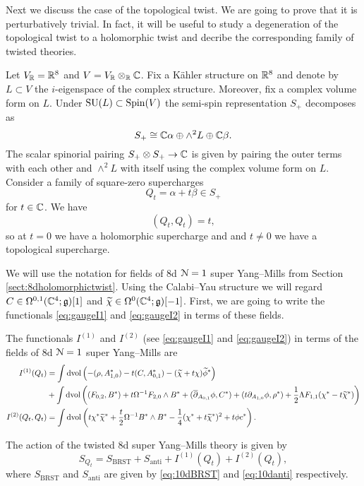 \documentclass[10pt, oneside]{article}
\begin{document}
Next we discuss the case of the topological twist. We are going to prove that it is perturbatively trivial. In fact, it will be useful to study a degeneration of the topological twist to a holomorphic twist and decribe the corresponding family of twisted theories.

Let $V_\mathbb R = \mathbb R^8$ and $V=V_\mathbb R\otimes_\mathbb R\mathbb C$. Fix a K\"ahler structure on $\mathbb R^8$ and denote by $L\subset V$ the $i$-eigenspace of the complex structure. Moreover, fix a complex volume form on $L$. Under $\mathrm{SU}(L)\subset \mathrm{Spin}(V)$ the semi-spin representation $S_+$ decomposes as
\[S_+\cong \mathbb C \alpha\oplus \wedge^2 L\oplus \mathbb C \beta.\]
The scalar spinorial pairing $S_+\otimes S_+\rightarrow \mathbb C$ is given by pairing the outer terms with each other and $\wedge^2L$ with itself using the complex volume form on $L$. Consider a family of square-zero supercharges
\begin{equation}
Q_t = \alpha + t\beta\in S_+
\label{eq:8dHodgefamily}
\end{equation}
for $t\in\mathbb C$. We have
\[(Q_t, Q_t) = t,\]
so at $t=0$ we have a holomorphic supercharge and and $t\neq 0$ we have a topological supercharge.

We will use the notation for fields of 8d $\mathcal N=1$ super Yang--Mills from Section \ref{sect:8dholomorphictwist}. Using the Calabi--Yau structure we will regard $C\in\Omega^{0, 1}(\mathbb C^4;\mathfrak g)[1]$ and $\widetilde{\chi}\in\Omega^0(\mathbb C^4;\mathfrak g)[-1]$. First, we are going to write the functionals \eqref{eq:gaugeI1} and \eqref{eq:gaugeI2} in terms of these fields.

\begin{prop}
The functionals $I^{(1)}$ and $I^{(2)}$ (see \eqref{eq:gaugeI1} and \eqref{eq:gaugeI2}) in terms of the fields of 8d $\mathcal N=1$ super Yang--Mills are
\begin{align*}
I^{(1)}(Q_t) &= \int \operatorname{dvol}\left(-(\rho, A_{1, 0}^*) - t(C, A_{0, 1}^*) - (\widetilde{\chi} + t\chi)\widetilde{\phi}^*\right) \\
&+ \int\operatorname{dvol}\left((F_{0, 2}, B^*) + t\Omega^{-1} F_{2, 0}\wedge B^* + (\overline{\partial}_{A_{0, 1}}\phi, C^*) + (t\partial_{A_{1, 0}} \phi, \rho^*) + \frac{1}{2}\Lambda F_{1, 1}(\chi^* - t\widetilde{\chi}^*)\right) \\
I^{(2)}(Q_t, Q_t) &= \int \operatorname{dvol} \left(t\chi^*\widetilde{\chi}^* + \frac{t}{2}\Omega^{-1}B^*\wedge B^* -\frac{1}{4}(\chi^* + t\widetilde{\chi}^*)^2 + t\phi c^*\right).
\end{align*}
\end{prop}

The action of the twisted 8d super Yang--Mills theory is given by
\[S_{Q_t} = S_{\mathrm{BRST}} + S_{\mathrm{anti}} + I^{(1)}(Q_t) + I^{(2)}(Q_t),\]
where $S_{\mathrm{BRST}}$ and $S_{\mathrm{anti}}$ are given by \eqref{eq:10dBRST} and \eqref{eq:10danti} respectively.
\end{document}
